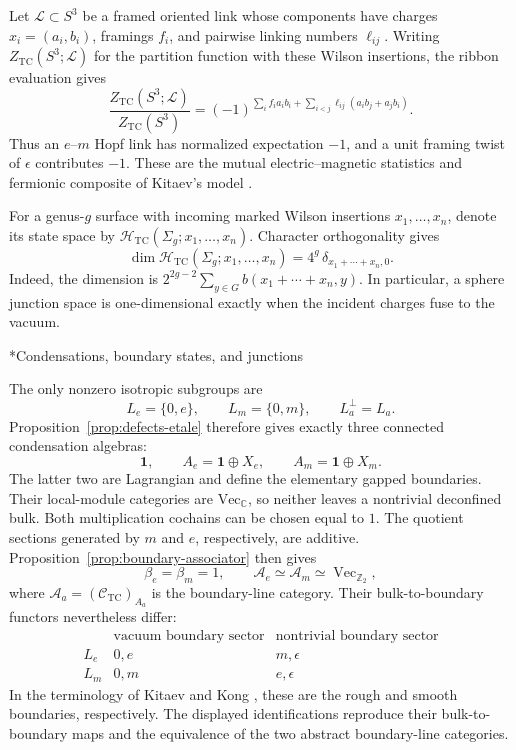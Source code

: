 \documentclass[12pt]{amsart}
\makeatletter
\renewcommand\subsection{\@startsection{subsection}{2}%
  \z@{.5\linespacing\@plus.7\linespacing}{-.5em}%
  {\normalfont\bfseries}}
\numberwithin{equation}{section}
\theoremstyle{definition}
\makeatother
\begin{document}
Let $\mathscr L\subset S^3$ be a framed oriented link whose
components have charges $x_i=(a_i,b_i)$, framings $f_i$, and
pairwise linking numbers $\ell_{ij}$.
Writing $Z_{\mathrm{TC}}(S^3;\mathscr L)$ for the partition function
with these Wilson insertions, the ribbon evaluation gives
\begin{equation}
\label{eq:tc-wilson-link}
\frac{Z_{\mathrm{TC}}(S^3;\mathscr L)}
     {Z_{\mathrm{TC}}(S^3)}
=
(-1)^{
\sum_i f_i a_i b_i+
\sum_{i<j}\ell_{ij}(a_i b_j+a_j b_i)
}.
\end{equation}
Thus an $e$--$m$ Hopf link has normalized expectation $-1$, and
a unit framing twist of $\epsilon$ contributes $-1$.
These are the mutual electric--magnetic statistics and fermionic
composite of Kitaev's model \cite{kitaev2003anyons}.

For a genus-$g$ surface with incoming marked Wilson insertions
$x_1,\ldots,x_n$, denote its state space by
$\mathcal H_{\mathrm{TC}}(\Sigma_g;x_1,\ldots,x_n)$.
Character orthogonality gives
\begin{equation}
\label{eq:tc-punctured-space}
\dim\mathcal H_{\mathrm{TC}}(\Sigma_g;x_1,\ldots,x_n)
=
4^g\,\delta_{x_1+\cdots+x_n,0}.
\end{equation}
Indeed, the dimension is
$2^{2g-2}\sum_{y\in G}b(x_1+\cdots+x_n,y)$.
In particular, a sphere junction space is one-dimensional exactly
when the incident charges fuse to the vacuum.


\subsection*{Condensations, boundary states, and junctions}

The only nonzero isotropic subgroups are
$$
L_e=\{0,e\},
\qquad
L_m=\{0,m\},
\qquad
L_a^\perp=L_a.
$$
Proposition~\ref{prop:defects-etale} therefore gives exactly three
connected condensation algebras:
$$
\mathbf1,
\qquad
A_e=\mathbf1\oplus X_e,
\qquad
A_m=\mathbf1\oplus X_m.
$$
The latter two are Lagrangian and define the elementary gapped
boundaries. Their local-module categories are
$\mathrm{Vec}_{\mathbb C}$, so neither leaves a nontrivial
deconfined bulk. Both multiplication cochains can be chosen equal to $1$. The quotient sections generated by $m$ and $e$, respectively,
are additive. Proposition~\ref{prop:boundary-associator} then gives
\begin{equation}
\label{eq:gauge-toric-boundaries}
\beta_e=\beta_m=1,
\qquad
\mathcal A_e\simeq\mathcal A_m
\simeq\operatorname{Vec}_{\mathbb Z_2},
\end{equation}
where
$\mathcal A_a=(\mathcal C_{\mathrm{TC}})_{A_a}$ is the
boundary-line category.
Their bulk-to-boundary functors nevertheless differ:
$$
\begin{array}{c|cc}
&\text{vacuum boundary sector}&\text{nontrivial boundary sector}\\
\hline
L_e&0,e&m,\epsilon\\
L_m&0,m&e,\epsilon
\end{array}
$$
In the terminology of Kitaev and Kong
\cite[Section~2]{kitaev2012models}, these are the rough and smooth
boundaries, respectively. The displayed identifications reproduce
their bulk-to-boundary maps and the equivalence of the two abstract
boundary-line categories.
\end{document}
